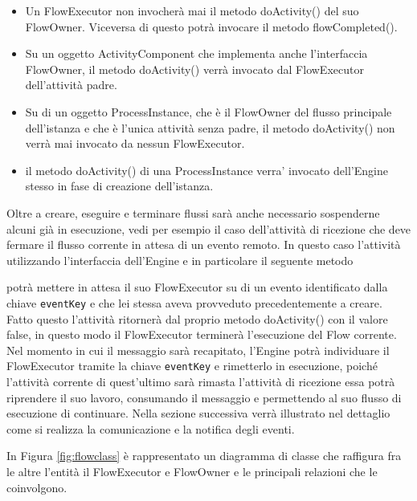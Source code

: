 \begin{itemize}
  \item Un FlowExecutor non invocherà mai il metodo doActivity() del suo
  FlowOwner. Viceversa di questo potrà invocare il metodo
  flowCompleted().
  
  \item Su un oggetto ActivityComponent che implementa anche l'interfaccia
  FlowOwner, il metodo doActivity() verrà invocato dal FlowExecutor dell'attività 
  padre.
  
  \item Su di un oggetto ProcessInstance, che \`e il FlowOwner del flusso
  principale dell'istanza e che \`e l'unica attività senza padre, 
  il metodo doActivity() non verrà mai invocato da nessun FlowExecutor.
  
  \item il metodo doActivity() di una ProcessInstance verra' invocato
  dell'Engine stesso in fase di creazione dell'istanza.
  
\end{itemize}

Oltre a creare, eseguire e terminare flussi sarà anche necessario sospenderne
alcuni già in esecuzione, vedi per esempio il caso dell'attività di ricezione
che deve fermare il flusso corrente in attesa di un evento remoto. In questo
caso l'attività utilizzando l'interfaccia dell'Engine e in particolare il
seguente metodo



potrà mettere in attesa il suo FlowExecutor su di un evento identificato dalla
chiave \texttt{eventKey} e che lei stessa aveva provveduto
precedentemente a creare. Fatto questo l'attività ritornerà dal proprio metodo
doActivity() con il valore false, in questo modo il FlowExecutor terminerà
l'esecuzione del Flow corrente. Nel momento in cui il messaggio sarà recapitato,
l'Engine potrà individuare il FlowExecutor tramite la chiave \texttt{eventKey} e
rimetterlo in esecuzione, poiché l'attività corrente di quest'ultimo sarà rimasta
l'attività di ricezione essa potrà riprendere il suo lavoro, consumando il
messaggio e permettendo al suo flusso di esecuzione di continuare. Nella sezione
successiva verrà illustrato nel dettaglio come si realizza la comunicazione e la
notifica degli eventi.

In Figura \ref{fig:flowclass} \`e rappresentato un diagramma di classe che
raffigura fra le altre l'entità il FlowExecutor e FlowOwner e le principali
relazioni che le coinvolgono.

